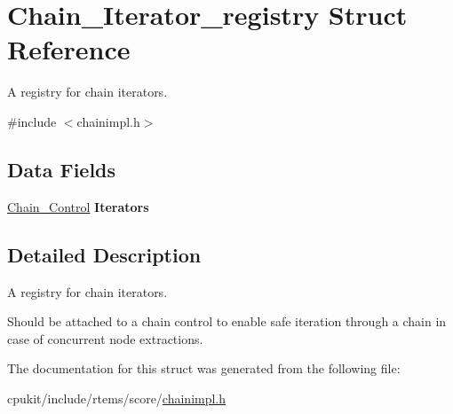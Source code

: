 \hypertarget{structChain__Iterator__registry}{}\section{Chain\+\_\+\+Iterator\+\_\+registry Struct Reference}
\label{structChain__Iterator__registry}


A registry for chain iterators.  




{\ttfamily \#include $<$chainimpl.\+h$>$}

\subsection*{Data Fields}
\begin{DoxyCompactItemize}
\item 
\mbox{\label{structChain__Iterator__registry_ab83dff37baee438c25d9792632165f01}} 
\mbox{\hyperlink{unionChain__Control}{Chain\+\_\+\+Control}} {\bfseries Iterators}
\end{DoxyCompactItemize}


\subsection{Detailed Description}
A registry for chain iterators. 

Should be attached to a chain control to enable safe iteration through a chain in case of concurrent node extractions. 

The documentation for this struct was generated from the following file\+:\begin{DoxyCompactItemize}
\item 
cpukit/include/rtems/score/\mbox{\hyperlink{chainimpl_8h}{chainimpl.\+h}}\end{DoxyCompactItemize}
